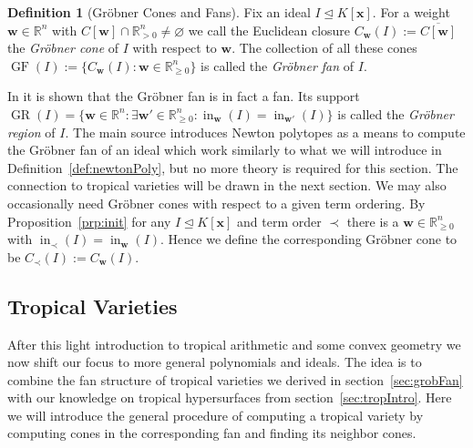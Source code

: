\documentclass[
  paper=a4,
  titlepage,
  bibliography=totoc,
  listof=totoc,
  pagesize=pdftex
]{scrartcl}
\numberwithin{figure}{section}
\numberwithin{equation}{section}
\numberwithin{table}{section}
\newcommand*\setR{\mathds{R}}
\let\vec\mathbf
\let\idealof\trianglelefteq
\DeclareMathOperator{\initial}{in}
\DeclareMathOperator{\GF}{GF}
\DeclareMathOperator{\GR}{GR}
\theoremstyle{definition}
\newtheorem{definition}{Definition}
\numberwithin{definition}{section}
\begin{document}
\begin{definition}[Gröbner Cones and Fans]
  \label{def:groebnerConeFan}
  Fix an ideal $I \idealof K[\vec x]$. For a weight $\vec w \in \setR^n$ with $C[\vec w]
  \cap \setR^n_{>0} \neq \varnothing$ we call the Euclidean closure $C_{\vec w}(I) :=
  \overline{C[\vec w]}$ the \emph{Gröbner cone} of $I$ with respect to $\vec w$. The
  collection of all these cones $\GF(I) := \{ C_{\vec w}(I) : \vec w \in \setR^n_{\geq0}
  \}$ is called the \emph{Gröbner fan} of $I$.
\end{definition}

In \cite[Theorem~2.19]{compGrobFan} it is shown that the Gröbner fan is in fact a fan.
Its support $\GR(I) = \{ \vec w \in \setR^n : \exists \vec w' \in
\setR^n_{\geq0}:\initial_{\vec w}(I) = \initial_{\vec w'}(I)\}$ is called the
\emph{Gröbner region} of $I$. The main source \cite{SturmGBCP} introduces Newton polytopes
as a means to compute the Gröbner fan of an ideal which work similarly to what we will
introduce in Definition~\ref{def:newtonPoly}, but no more theory is required for this
section. The connection to tropical varieties will be drawn in the next section. We may
also occasionally need Gröbner cones with respect to a given term ordering. By
Proposition~\ref{prp:init} for any $I \idealof K[\vec x]$ and term order $\prec$ there is
a $\vec w \in \setR^n_{\geq0}$ with $\initial_\prec(I) = \initial_{\vec w}(I)$. Hence we
define the corresponding Gröbner cone to be $C_\prec(I) := C_{\vec w}(I)$.

\subsection{Tropical Varieties}
\label{sec:tropVar}

After this light introduction to tropical arithmetic and some convex geometry we now shift
our focus to more general polynomials and ideals. The idea is to combine the fan structure
of tropical varieties we derived in section~\ref{sec:grobFan} with our knowledge on
tropical hypersurfaces from section~\ref{sec:tropIntro}. Here we will introduce the
general procedure of computing a tropical variety by computing cones in the corresponding
fan and finding its neighbor cones.
\end{document}
